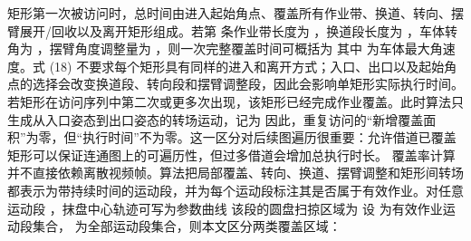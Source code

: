 {}
\markdownRendererSectionEnd \markdownRendererSectionBegin
{}\markdownRendererParagraphSeparator
{}矩形第一次被访问时，总时间由进入起始角点、覆盖所有作业带、换道、转向、摆臂展开/回收以及离开矩形组成。若第  条作业带长度为 ，换道段长度为 ，车体转角为 ，摆臂角度调整量为 ，则一次完整覆盖时间可概括为\markdownRendererParagraphSeparator
{}\markdownRendererParagraphSeparator
{}其中 \markdownRendererInlineMath{\omega_{\max}} 为车体最大角速度。式 (18) 不要求每个矩形具有同样的进入和离开方式；入口、出口以及起始角点的选择会改变换道段、转向段和摆臂调整段，因此会影响单矩形实际执行时间。\markdownRendererParagraphSeparator
{}若矩形在访问序列中第二次或更多次出现，该矩形已经完成作业覆盖。此时算法只生成从入口姿态到出口姿态的转场运动，记为\markdownRendererParagraphSeparator
{}\markdownRendererParagraphSeparator
{}因此，重复访问的“新增覆盖面积”为零，但“执行时间”不为零。这一区分对后续图遍历很重要：允许借道已覆盖矩形可以保证连通图上的可遍历性，但过多借道会增加总执行时长。\markdownRendererParagraphSeparator
{}
\markdownRendererSectionEnd 
\markdownRendererSectionEnd \markdownRendererSectionBegin
{}\markdownRendererParagraphSeparator
{}覆盖率计算并不直接依赖离散视频帧。算法把局部覆盖、转向、换道、摆臂调整和矩形间转场都表示为带持续时间的运动段，并为每个运动段标注其是否属于有效作业。对任意运动段 ，抹盘中心轨迹可写为参数曲线\markdownRendererParagraphSeparator
{}\markdownRendererParagraphSeparator
{}该段的圆盘扫掠区域为\markdownRendererParagraphSeparator
{}\markdownRendererParagraphSeparator
{}设  为有效作业运动段集合， 为全部运动段集合，则本文区分两类覆盖区域：\markdownRendererParagraphSeparator
{}\markdownRendererParagraphSeparator
